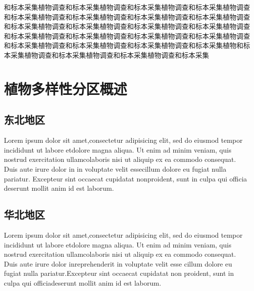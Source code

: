 \documentclass[utf8]{book}
\begin{document}
\begin{multicols}{2}

和标本采集植物调查和标本采集植物调查和标本采集植物调查和标本采集植物调查和标本采集植物调查和标本采集植物调查和标本采集植物调查和标本采集植物调查和标本采集植物调查和标本采集植物调查和标本采集植物调查和标本采集植物调查和标本采集植物调查和标本采集植物调查和标本采集植物调查和标本采集植物调查和标本采集植物调查和标本采集植物调查和标本采集植物调查和标本采集植物和标本采集植物调查和标本采集植物调查和标本采集植物调查和标本采集


\end{multicols}


\part{植物多样性分区概述}


\chapter{东北地区}


\begin{multicols}{2}

Lorem ipsum dolor sit amet,consectetur adipisicing elit, sed do eiusmod tempor incididunt ut labore etdolore magna aliqua. Ut enim ad minim veniam, quis nostrud exercitation ullamcolaboris nisi ut aliquip ex ea commodo consequat. Duis aute irure dolor in  in voluptate velit essecillum dolore eu fugiat nulla pariatur. Excepteur sint occaecat cupidatat nonproident, sunt in culpa qui officia deserunt mollit anim id est laborum.

\end{multicols}


\chapter{华北地区}

\begin{multicols}{2}

Lorem ipsum dolor sit amet,consectetur adipisicing elit, sed do eiusmod tempor incididunt ut labore etdolore magna aliqua. Ut enim ad minim veniam, quis nostrud exercitation ullamcolaboris nisi ut aliquip ex ea commodo consequat. Duis aute irure dolor inreprehenderit in voluptate velit esse cillum dolore eu fugiat nulla pariatur.Excepteur sint occaecat cupidatat non proident, sunt in culpa qui officiadeserunt mollit anim id est laborum.

\end{multicols}
\end{document}
